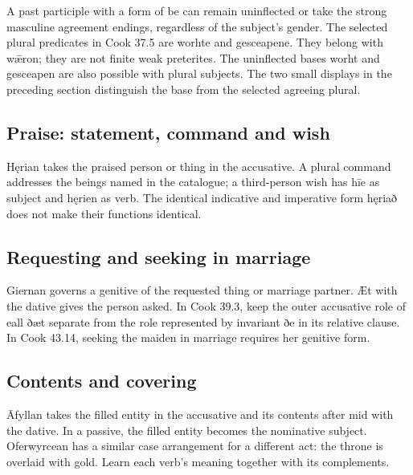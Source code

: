 A past participle with a form of be can remain uninflected or take the strong masculine agreement endings, regardless of the subject’s gender. The selected plural predicates in Cook 37.5 are worhte and gesceapene. They belong with wǣron; they are not finite weak preterites. The uninflected bases worht and gesceapen are also possible with plural subjects. The two small displays in the preceding section distinguish the base from the selected agreeing plural.

\subsection*{Praise: statement, command and wish}

Hęrian takes the praised person or thing in the accusative. A plural command addresses the beings named in the catalogue; a third-person wish has hīe as subject and hęrien as verb. The identical indicative and imperative form hęriað does not make their functions identical.

\subsection*{Requesting and seeking in marriage}

Giernan governs a genitive of the requested thing or marriage partner. Æt with the dative gives the person asked. In Cook 39.3, keep the outer accusative role of eall ðæt separate from the role represented by invariant ðe in its relative clause. In Cook 43.14, seeking the maiden in marriage requires her genitive form.

\subsection*{Contents and covering}

Āfyllan takes the filled entity in the accusative and its contents after mid with the dative. In a passive, the filled entity becomes the nominative subject. Oferwyrcean has a similar case arrangement for a different act: the throne is overlaid with gold. Learn each verb’s meaning together with its complements.

